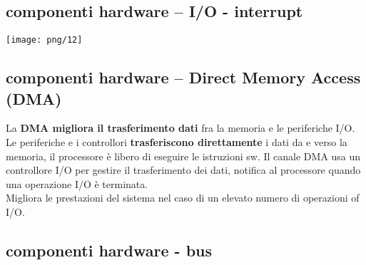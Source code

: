 \documentclass[12pt, letterpaper]{article}
\begin{document}
\subsection{componenti hardware – I/O - interrupt}

\texttt{[image: png/12]}\\

\subsection{componenti hardware – Direct Memory Access (DMA)}

La \textbf{DMA migliora il trasferimento dati} fra la memoria e le periferiche I/O.
\\Le periferiche e i controllori \textbf{trasferiscono direttamente} i dati da e verso la
memoria, il processore è libero di eseguire le istruzioni sw.
Il canale DMA usa un controllore I/O per gestire il trasferimento dei dati, notifica al processore quando una operazione I/O è terminata.\\
Migliora le prestazioni del sistema nel caso di un elevato numero di
operazioni of I/O.

\subsection{componenti hardware - bus}
\end{document}
